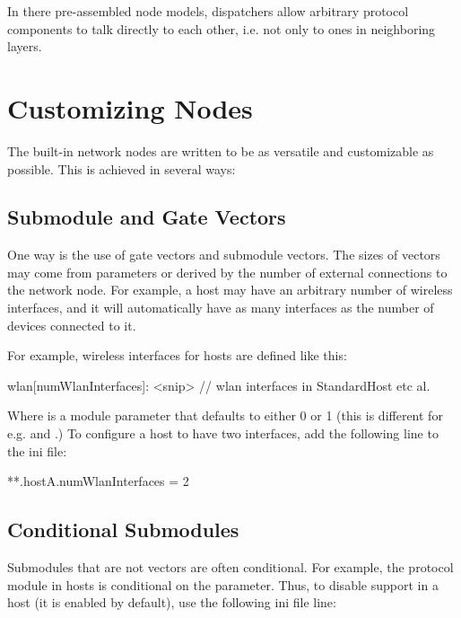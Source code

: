 In there pre-assembled node models, dispatchers allow arbitrary
protocol components to talk directly to each other, i.e. not only
to ones in neighboring layers.

\section{Customizing Nodes}

The built-in network nodes are written to be as versatile and customizable
as possible. This is achieved in several ways:

\subsection*{Submodule and Gate Vectors}

One way is the use of gate vectors and submodule vectors. The sizes 
of vectors may come from parameters or derived by the number of
external connections to the network node. For example, a host may
have an arbitrary number of wireless interfaces, and it will automatically
have as many  interfaces as the number of  
devices connected to it.

For example, wireless interfaces for hosts are defined like this:

\begin{ned}
wlan[numWlanInterfaces]: <snip> // wlan interfaces in StandardHost etc al.
\end{ned}

Where  is a module parameter that defaults to 
either 0 or 1 (this is different for e.g.  and
.) To configure a host to have two interfaces, 
add the following line to the ini file: 

\begin{inifile}
**.hostA.numWlanInterfaces = 2
\end{inifile}

\subsection*{Conditional Submodules}

Submodules that are not vectors are often conditional. For example,
the  protocol module in hosts is conditional on
the  parameter. Thus, to disable  support
in a host (it is enabled by default), use the following ini file line:

